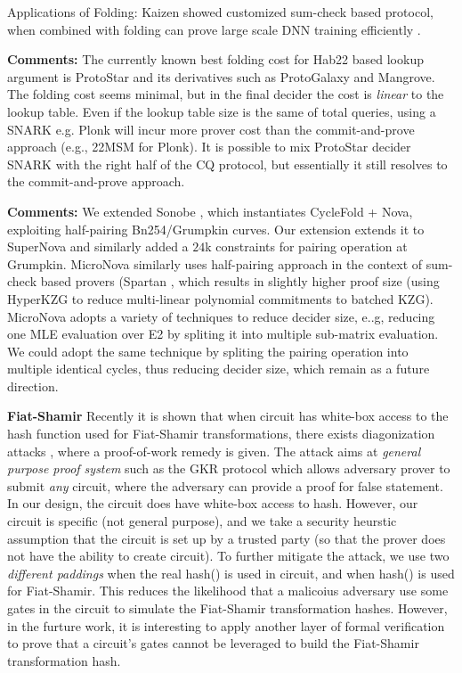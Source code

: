 Applications of Folding: Kaizen showed customized sum-check based
protocol, when combined with folding can prove large scale
DNN training efficiently \cite{Kaizen}.

{\bf Comments:} The currently known best folding cost for
Hab22 based lookup argument is ProtoStar and its derivatives
such as ProtoGalaxy and Mangrove. The folding cost seems minimal,
but in the final decider the cost is {\em linear} to the lookup table.
Even if the lookup table size is the same of total queries,
using a SNARK e.g. Plonk will incur more prover cost than
the commit-and-prove approach (e.g., 22MSM for Plonk). It is
possible to mix ProtoStar decider SNARK with the right half of the
CQ protocol, but essentially it still resolves to the 
commit-and-prove approach.

{\bf Comments:} We extended Sonobe \cite{Sonobe}, which instantiates
CycleFold + Nova, exploiting half-pairing Bn254/Grumpkin curves.
Our extension extends it to SuperNova and similarly added
a $24$k constraints for pairing operation at Grumpkin.
MicroNova \cite{MicroNova} similarly uses half-pairing approach
in the context of sum-check based provers (Spartan \cite{Spartan},
which results in slightly higher proof size (using HyperKZG 
to reduce multi-linear polynomial commitments to batched KZG).
MicroNova adopts a variety of techniques to reduce decider size,
e..g, reducing one MLE evaluation over E2 by spliting it into
multiple sub-matrix evaluation. We could adopt the same technique
by spliting the pairing operation into multiple identical cycles,
thus reducing decider size, which remain as a future direction.

{\bf Fiat-Shamir} Recently it is shown that when
circuit has white-box access to the hash function used
for Fiat-Shamir transformations, there exists
diagonization attacks \cite{kho25fiat,arnon2025pow}, where
a proof-of-work remedy is given. The attack aims at
{\em general purpose proof system} such as the GKR protocol
which allows adversary prover to submit {\em any} circuit, where
the adversary can provide a proof for false statement.
In our design, the circuit does have white-box access to hash.
However, our circuit is specific (not general purpose), and
we take a security heurstic assumption that the circuit 
is set up by a trusted party (so that the prover does not have
the ability to create circuit). To further mitigate the attack,
we use two {\em different paddings} when the real hash() is used in circuit,
and when hash() is used for Fiat-Shamir. This reduces the likelihood
that a malicoius adversary use some gates in the circuit to simulate
the Fiat-Shamir transformation hashes. However, in the furture work,
it is interesting to apply another layer of formal verification
to prove that a circuit's gates cannot be leveraged to build
the Fiat-Shamir transformation hash.


